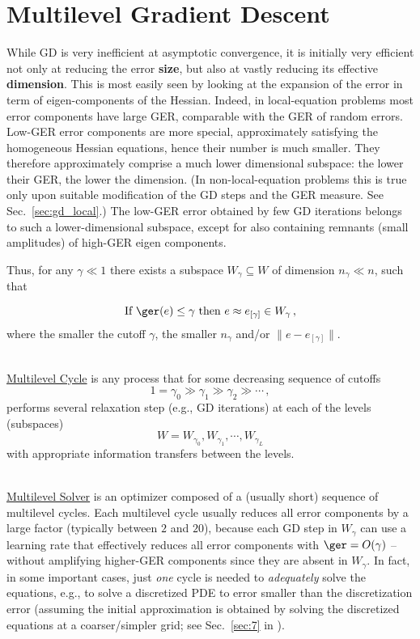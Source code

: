 \documentclass{article} %
\begin{document}
\section{Multilevel Gradient Descent}
\label{sec:mlgd}
While GD is very inefficient at asymptotic convergence, it is initially very efficient not only at reducing the error \textbf{size}, but also at vastly reducing its effective \textbf{dimension}. This is most easily seen by looking at the expansion of the error in term of eigen-components of the Hessian. Indeed, in local-equation problems most error components have large GER, comparable with the GER of random errors. Low-GER error components are more special, approximately satisfying the homogeneous Hessian equations, hence their number is much smaller. They therefore approximately comprise a much lower dimensional subspace: the lower their GER, the lower the dimension. (In non-local-equation problems this is true only upon suitable modification of the GD steps and the GER measure. See Sec.~\ref{sec:gd_local}.)  The low-GER error obtained by few GD iterations belongs to such a lower-dimensional subspace, except for also containing remnants (small amplitudes) of high-GER eigen components.  

Thus, for any $\gamma \ll 1$ there exists a subspace $W_{\gamma} \subseteq W$ of dimension $n_{\gamma} \ll n$, such that

\begin{equation}
	{\mbox{If }} \ger(e) \leq \gamma {\mbox{ then }} e \approx e_{[\gamma]} \in W_{\gamma}\,,
	\label{ger_gamma}
\end{equation}
where the smaller the cutoff $\gamma$, the smaller $n_{\gamma}$ and/or $\|e -e_{[\gamma]}\|$.

{\mbox{}}\\ \noindent
\underline{Multilevel Cycle} is any process that for some decreasing sequence of cutoffs
$$
1 = \gamma_0 \gg \gamma_1 \gg \gamma_2 \gg \cdots\,,
$$
performs several relaxation step (e.g., GD iterations) at each of the levels (subspaces)
$$ W = W_{\gamma_0}, W_{\gamma_1}, \cdots, W_{\gamma_L} $$
with appropriate information transfers between the levels.

{\mbox{}}\\
\underline{Multilevel Solver} is an optimizer composed of a (usually short) sequence of multilevel cycles. Each multilevel cycle usually reduces all error components by a large factor (typically between $2$ and $20$), because each  GD step in $W_{\gamma}$ can use a learning rate that effectively reduces all error components with $\ger = O(\gamma)$ -- without amplifying higher-GER components since they are absent in $W_{\gamma}$. In fact, in some important cases, just {\it one} cycle is needed to {\it adequately} solve the equations, e.g., to solve a discretized PDE to error smaller than the discretization error (assuming the initial approximation is obtained by solving the discretized equations at a coarser/simpler grid; see Sec.~\ref{sec:7} in \cite{4}).
\end{document}

